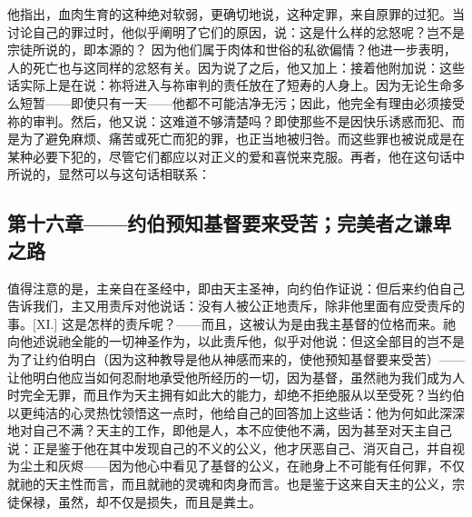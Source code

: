 他指出，血肉生育的这种绝对软弱，更确切地说，这种定罪，来自原罪的过犯。当讨论自己的罪过时，他似乎阐明了它们的原因，说：这是什么样的忿怒呢？岂不是宗徒所说的，即本源的？ 因为他们属于肉体和世俗的私欲偏情？他进一步表明，人的死亡也与这同样的忿怒有关。因为说了之后，他又加上：接着他附加说：这些话实际上是在说：祢将进入与祢审判的责任放在了短寿的人身上。因为无论生命多么短暂——即使只有一天——他都不可能洁净无污；因此，他完全有理由必须接受祢的审判。然后，他又说：这难道不够清楚吗？即使那些不是因快乐诱惑而犯、而是为了避免麻烦、痛苦或死亡而犯的罪，也正当地被归咎。而这些罪也被说成是在某种必要下犯的，尽管它们都应以对正义的爱和喜悦来克服。再者，他在这句话中所说的，显然可以与这句话相联系：\par


\subsection{第十六章——约伯预知基督要来受苦；完美者之谦卑之路}

值得注意的是，主亲自在圣经中，即由天主圣神，向约伯作证说：但后来约伯自己告诉我们，主又用责斥对他说话：没有人被公正地责斥，除非他里面有应受责斥的事。[XI.] 这是怎样的责斥呢？——而且，这被认为是由我主基督的位格而来。祂向他述说祂全能的一切神圣作为，以此责斥他，似乎对他说：但这全部目的岂不是为了让约伯明白（因为这种教导是他从神感而来的，使他预知基督要来受苦）——让他明白他应当如何忍耐地承受他所经历的一切，因为基督，虽然祂为我们成为人时完全无罪，而且作为天主拥有如此大的能力，却绝不拒绝服从以至受死？当约伯以更纯洁的心灵热忱领悟这一点时，他给自己的回答加上这些话：他为何如此深深地对自己不满？天主的工作，即他是人，本不应使他不满，因为甚至对天主自己说：正是鉴于他在其中发现自己的不义的公义，他才厌恶自己、消灭自己，并自视为尘土和灰烬——因为他心中看见了基督的公义，在祂身上不可能有任何罪，不仅就祂的天主性而言，而且就祂的灵魂和肉身而言。也是鉴于这来自天主的公义，宗徒保禄，虽然，却不仅是损失，而且是粪土。\par

